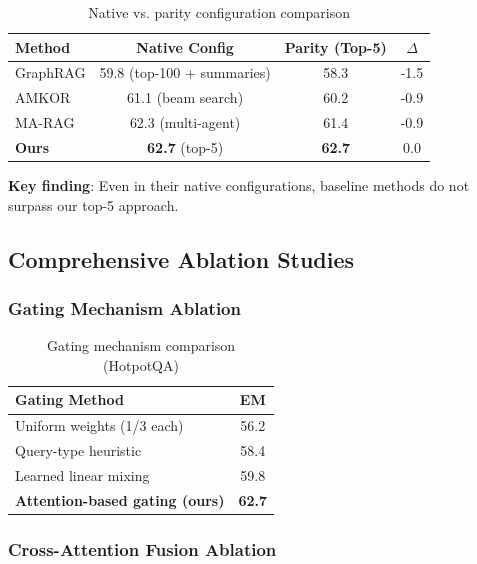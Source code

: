 \documentclass[10pt,twocolumn]{article}
\begin{document}
\begin{table}[t]
\centering
\caption{Native vs. parity configuration comparison}
\label{tab:native_config}
\small
\begin{tabular}{@{}lccc@{}}
\toprule
\textbf{Method} & \textbf{Native Config} & \textbf{Parity (Top-5)} & \textbf{$\Delta$} \\
\midrule
GraphRAG & 59.8 (top-100 + summaries) & 58.3 & -1.5 \\
AMKOR & 61.1 (beam search) & 60.2 & -0.9 \\
MA-RAG & 62.3 (multi-agent) & 61.4 & -0.9 \\
\midrule
\textbf{Ours} & \textbf{62.7} (top-5) & \textbf{62.7} & 0.0 \\
\bottomrule
\end{tabular}
\end{table}

\textbf{Key finding}: Even in their native configurations, baseline methods do not surpass our top-5 approach.


\subsection{Comprehensive Ablation Studies}
\label{sec:ablations}

\subsubsection{Gating Mechanism Ablation}
\label{sec:gating_ablation}

\begin{table}[h]
\centering
\caption{Gating mechanism comparison (HotpotQA)}
\label{tab:gating_ablation}
\small
\begin{tabular}{@{}lc@{}}
\toprule
\textbf{Gating Method} & \textbf{EM} \\
\midrule
Uniform weights (1/3 each) & 56.2 \\
Query-type heuristic & 58.4 \\
Learned linear mixing & 59.8 \\
\textbf{Attention-based gating (ours)} & \textbf{62.7} \\
\bottomrule
\end{tabular}
\end{table}

\subsubsection{Cross-Attention Fusion Ablation}
\label{sec:fusion_ablation}
\end{document}
